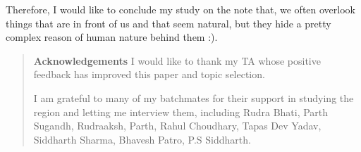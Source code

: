 \documentclass[twocolumn, 12pt]{article}
\begin{document}
Therefore, I would like to conclude my study on the note that, we often overlook
things that are in front of us and that seem natural, but they hide a pretty complex reason of 
human nature behind them :). 


\begin{quote}
\textbf{Acknowledgements} I would like to thank my TA whose positive feedback has improved this paper and topic selection.

I am grateful to many of my batchmates for their support in studying the region and letting me interview them,
including Rudra Bhati, Parth Sugandh, Rudraaksh, Parth, Rahul Choudhary, Tapas Dev Yadav, Siddharth Sharma, Bhavesh Patro, P.S Siddharth.
\end{quote}





\end{document}
